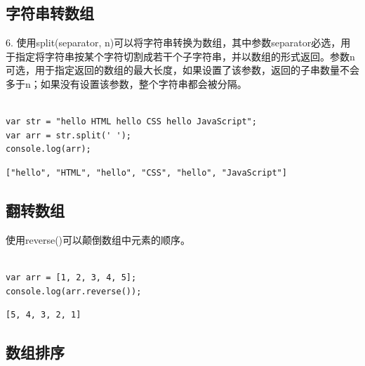\vspace{0.5cm}

\subsection{字符串转数组}

6. 使用split(separator, n)可以将字符串转换为数组，其中参数separator必选，用于指定将字符串按某个字符切割成若干个子字符串，并以数组的形式返回。参数n可选，用于指定返回的数组的最大长度，如果设置了该参数，返回的子串数量不会多于n；如果没有设置该参数，整个字符串都会被分隔。\\

\\

\begin{lstlisting}[style=htmlcssjs]
var str = "hello HTML hello CSS hello JavaScript";
var arr = str.split(' ');
console.log(arr);
\end{lstlisting}

\begin{tcolorbox}
	\begin{verbatim}
["hello", "HTML", "hello", "CSS", "hello", "JavaScript"]
	\end{verbatim}
\end{tcolorbox}

\vspace{0.5cm}

\subsection{翻转数组}

使用reverse()可以颠倒数组中元素的顺序。\\

\\

\begin{lstlisting}[style=htmlcssjs]
var arr = [1, 2, 3, 4, 5];
console.log(arr.reverse());
\end{lstlisting}

\begin{tcolorbox}
	\begin{verbatim}
[5, 4, 3, 2, 1]
	\end{verbatim}
\end{tcolorbox}

\vspace{0.5cm}

\subsection{数组排序}


